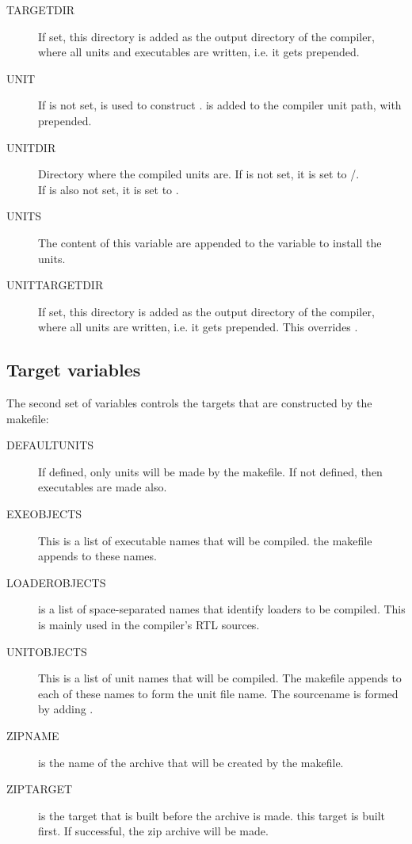 \documentclass{report}
\begin{document}
\begin{description}
\item[TARGETDIR] If set, this directory is added as the output directory of
the compiler, where all units and executables are written, i.e. it gets
 prepended.

\item[UNIT] If  is not set,  is used to construct
.  is added to the compiler unit path, with 
prepended.

\item[UNITDIR] Directory where the  compiled units are.
If  is not set, it is set to /. \\
If  is also not set, it is set to .

\item[UNITS] The content of this variable are appended to the
 variable to install the units.

\item[UNITTARGETDIR] If set, this directory is added as the output directory of
the compiler, where all units are written, i.e. it gets
 prepended. This overrides .
\end{description}

\subsection{Target variables}

The second set of variables controls the targets that are constructed
by the makefile:

\begin{description}
\item[DEFAULTUNITS] If defined, only units will be made by the makefile. If
not defined, then executables are made also.
\item[EXEOBJECTS] This is a list of executable names that will be compiled.
the makefile appends  to these names.
\item[LOADEROBJECTS] is a list of space-separated names that identify
loaders to be compiled. This is mainly used in the compiler's RTL sources.
\item[UNITOBJECTS] This is a list of unit names that will be compiled. The
makefile appends  to each of these names to form the unit file
name. The sourcename is formed by adding .
\item[ZIPNAME] is the name of the archive that will be created by the
makefile.
\item[ZIPTARGET] is the target that is built before the archive is made.
this target is built first. If successful, the zip archive will be made.
\end{description}
\end{document}
